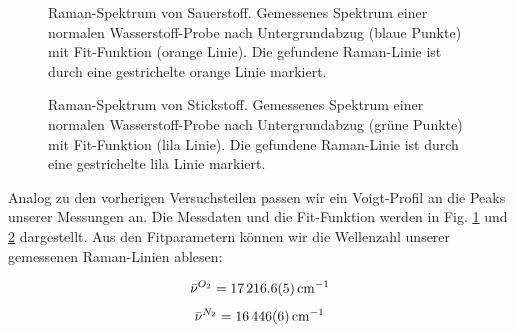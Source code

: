 \documentclass[11pt]{article}
\begin{document}
\begin{figure}[htbp]
	\centering
   \caption{\small Raman-Spektrum von Sauerstoff. Gemessenes Spektrum einer normalen Wasserstoff-Probe nach Untergrundabzug (blaue Punkte) mit Fit-Funktion (orange Linie). Die gefundene Raman-Linie ist durch eine gestrichelte orange Linie markiert.}
   \label{fig:O2}
\end{figure}

\begin{figure}[htbp]
	\centering
   \caption{\small Raman-Spektrum von Stickstoff. Gemessenes Spektrum einer normalen Wasserstoff-Probe nach Untergrundabzug (grüne Punkte) mit Fit-Funktion (lila Linie). Die gefundene Raman-Linie ist durch eine gestrichelte lila Linie markiert.}
   \label{fig:N2}
\end{figure}

Analog zu den vorherigen Versuchsteilen passen wir ein Voigt-Profil an die Peaks unserer Messungen an. Die Messdaten und die Fit-Funktion werden in Fig. \ref{fig:O2} und \ref{fig:N2} dargestellt. Aus den Fitparametern können wir die Wellenzahl unserer gemessenen Raman-Linien ablesen:

$$\bar{\nu}^{O_2} = \SI{17216.6\pm 0.5}{cm^{-1}}$$
$$\bar{\nu}^{N_2} = \SI{16446\pm 6}{cm^{-1}}$$
\end{document}
